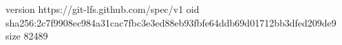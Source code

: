 version https://git-lfs.github.com/spec/v1
oid sha256:2c7f9908ec984a31cac7fbc3e3ed88eb93fbfe64ddb69d01712bb3dfed209de9
size 82489
